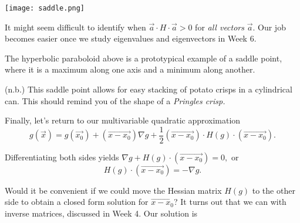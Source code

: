 \documentclass[a4paper, 12pt,oneside,openany]{book}
\begin{document}


\texttt{[image: saddle.png]} 

It might seem difficult to identify when $\vec{a} \cdot H \cdot \vec{a} >0$ for \emph{all vectors} $\vec{a}$. Our job becomes easier once we study eigenvalues and eigenvectors in Week 6.

The hyperbolic paraboloid above is a prototypical example of a saddle point, where it is a maximum along one axis and a minimum along another.

(n.b.) This saddle point allows for easy stacking of potato crisps in a cylindrical can. This should remind you of the shape of a \emph{Pringles crisp.} 

Finally, let's return to our multivariable quadratic approximation $$g(\vec{x}) = g(\vec{x_0}) + (\overrightarrow{x-x_0}) \nabla g + \frac{1}{2} (\overrightarrow{x-x_0}) \cdot H(g) \cdot (\overrightarrow{x-x_0}).$$

Differentiating both sides yields $\nabla g + H(g) \cdot (\overrightarrow{x-x_0}) = 0,$ or $$H(g) \cdot (\overrightarrow{x-x_0}) = -\nabla g.$$ 

Would it be convenient if we could move the Hessian matrix $H(g)$ to the other side to obtain a closed form solution for $\overrightarrow{x-x_0}$? It turns out that we can with inverse matrices, discussed in Week 4. Our solution is
\end{document}
